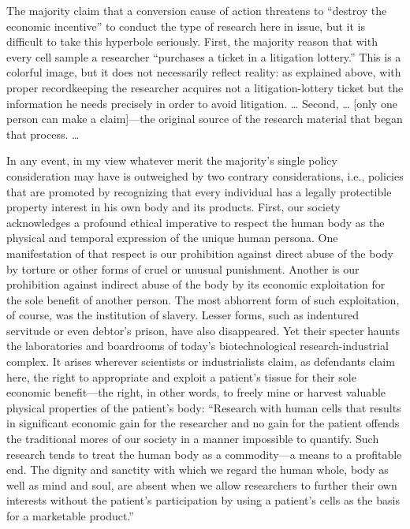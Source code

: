 The majority claim that a conversion cause of action threatens to ``destroy the
economic incentive'' to conduct the type of research here in issue, but it is
difficult to take this hyperbole seriously. First, the majority reason that
with every cell sample a researcher ``purchases a ticket in a litigation
lottery.'' This is a colorful image, but it does not necessarily reflect
reality: as explained above, with proper recordkeeping the researcher acquires
not a litigation-lottery ticket but the information he needs precisely in order
to avoid litigation. {\dots} Second,  {\dots}  [only one person can make a
claim]---the original source of the research material that began that process.
{\dots}

In any event, in my view whatever merit the majority's single policy
consideration may have is outweighed by two contrary considerations, i.e.,
policies that are promoted by recognizing that every individual has a legally
protectible property interest in his own body and its products. First, our
society acknowledges a profound ethical imperative to respect the human body as
the physical and temporal expression of the unique human persona. One
manifestation of that respect is our prohibition against direct abuse of the
body by torture or other forms of cruel or unusual punishment. Another is our
prohibition against indirect abuse of the body by its economic exploitation for
the sole benefit of another person. The most abhorrent form of such
exploitation, of course, was the institution of slavery. Lesser forms, such as
indentured servitude or even debtor's prison, have also disappeared. Yet their
specter haunts the laboratories and boardrooms of today's biotechnological
research-industrial complex. It arises wherever scientists or industrialists
claim, as defendants claim here, the right to appropriate and exploit a
patient's tissue for their sole economic benefit---the right, in other words,
to freely mine or harvest valuable physical properties of the patient's body:
``Research with human cells that results in significant economic gain for the
researcher and no gain for the patient offends the traditional mores of our
society in a manner impossible to quantify. Such research tends to treat the
human body as a commodity---a means to a profitable end. The dignity and
sanctity with which we regard the human whole, body as well as mind and soul,
are absent when we allow researchers to further their own interests without the
patient's participation by using a patient's cells as the basis for a
marketable product.'' 

